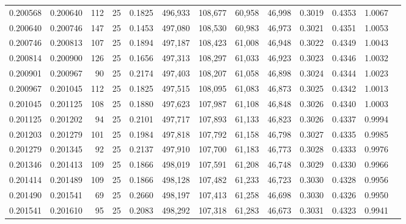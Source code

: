 \begin{tabular}{rrrrrrrrrrrrr}
0.200568 & 0.200640 &   112 &  25 &                                     0.1825 & 496,933 & 108,677 &  60,958 &  46,998 & 0.3019 & 0.4353 & 1.0067 \\
0.200640 & 0.200746 &   147 &  25 &                                     0.1453 & 497,080 & 108,530 &  60,983 &  46,973 & 0.3021 & 0.4351 & 1.0053 \\
0.200746 & 0.200813 &   107 &  25 &                                     0.1894 & 497,187 & 108,423 &  61,008 &  46,948 & 0.3022 & 0.4349 & 1.0043 \\
0.200814 & 0.200900 &   126 &  25 &                                     0.1656 & 497,313 & 108,297 &  61,033 &  46,923 & 0.3023 & 0.4346 & 1.0032 \\
0.200901 & 0.200967 &    90 &  25 &                                     0.2174 & 497,403 & 108,207 &  61,058 &  46,898 & 0.3024 & 0.4344 & 1.0023 \\
0.200967 & 0.201045 &   112 &  25 &                                     0.1825 & 497,515 & 108,095 &  61,083 &  46,873 & 0.3025 & 0.4342 & 1.0013 \\
0.201045 & 0.201125 &   108 &  25 &                                     0.1880 & 497,623 & 107,987 &  61,108 &  46,848 & 0.3026 & 0.4340 & 1.0003 \\
0.201125 & 0.201202 &    94 &  25 &                                     0.2101 & 497,717 & 107,893 &  61,133 &  46,823 & 0.3026 & 0.4337 & 0.9994 \\
0.201203 & 0.201279 &   101 &  25 &                                     0.1984 & 497,818 & 107,792 &  61,158 &  46,798 & 0.3027 & 0.4335 & 0.9985 \\
0.201279 & 0.201345 &    92 &  25 &                                     0.2137 & 497,910 & 107,700 &  61,183 &  46,773 & 0.3028 & 0.4333 & 0.9976 \\
0.201346 & 0.201413 &   109 &  25 &                                     0.1866 & 498,019 & 107,591 &  61,208 &  46,748 & 0.3029 & 0.4330 & 0.9966 \\
0.201414 & 0.201489 &   109 &  25 &                                     0.1866 & 498,128 & 107,482 &  61,233 &  46,723 & 0.3030 & 0.4328 & 0.9956 \\
0.201490 & 0.201541 &    69 &  25 &                                     0.2660 & 498,197 & 107,413 &  61,258 &  46,698 & 0.3030 & 0.4326 & 0.9950 \\
0.201541 & 0.201610 &    95 &  25 &                                     0.2083 & 498,292 & 107,318 &  61,283 &  46,673 & 0.3031 & 0.4323 & 0.9941 \\

\end{tabular}
